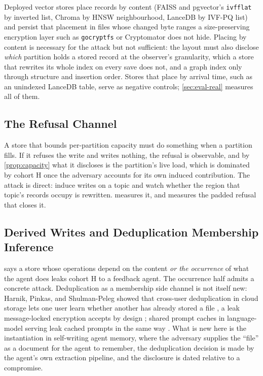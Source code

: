 Deployed vector stores place records by content (FAISS and pgvector's \texttt{ivfflat} by inverted
list, Chroma by HNSW neighbourhood, LanceDB by IVF-PQ list) and persist that placement in files whose
changed byte ranges a size-preserving encryption layer such as \texttt{gocryptfs} or Cryptomator does
not hide. Placing by content is necessary for the attack but not sufficient: the layout must also
disclose \emph{which} partition holds a stored record at the observer's granularity, which a store
that rewrites its whole index on every save does not, and a graph index only through structure and
insertion order. Stores that place by arrival time, such as an unindexed LanceDB table, serve as
negative controls; \cref{sec:eval-real} measures all of them.

\subsection{The Refusal Channel}
\label{sec:attack-refusal}

A store that bounds per-partition capacity must do something when a partition fills. If it refuses
the write and writes nothing, the refusal is observable, and by \cref{prop:capacity} what it
discloses is the partition's live load, which is dominated by cohort H once the adversary accounts
for its own induced contribution. The attack is direct: induce writes on a topic and watch whether
the region that topic's records occupy is rewritten.  measures it, and
measures the padded refusal that closes it.

\subsection{Derived Writes and Deduplication Membership Inference}
\label{sec:attack-derived}

 says a store whose operations depend on the content \emph{or the occurrence} of
what the agent does leaks cohort H to a feedback agent. The occurrence half admits a concrete
attack. Deduplication as a membership side channel is not itself new: Harnik, Pinkas, and
Shulman-Peleg showed that cross-user deduplication in cloud storage lets one user learn whether
another has already stored a file \cite{harnik2010side}, a leak message-locked encryption accepts by
design \cite{bellare2013mle}; shared prompt caches in language-model serving leak cached prompts in
the same way \cite{gu2025auditing}. What is new here is the instantiation in
self-writing agent memory, where the adversary supplies the ``file'' as a document for the agent to
remember, the deduplication decision is made by the agent's own extraction pipeline, and the
disclosure is dated relative to a compromise.

